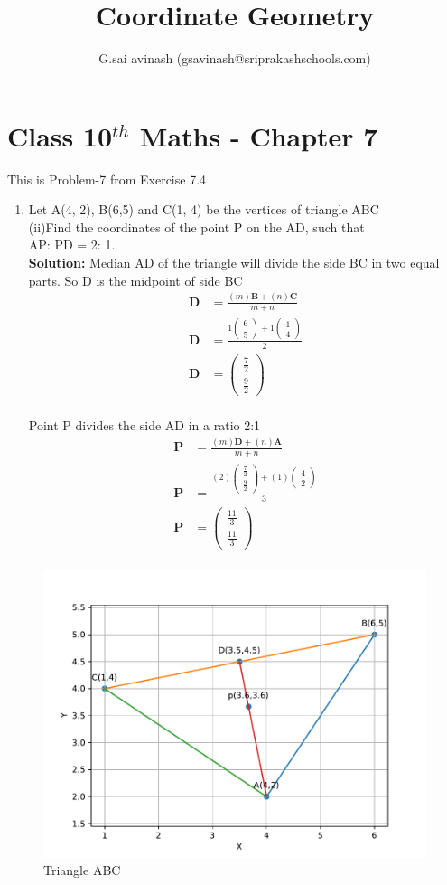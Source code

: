 \documentclass[10pt]{article}
\title{Coordinate Geometry}
\author{G.sai avinash (gsavinash@sriprakashschools.com)}
\newcommand{\myvec}[1]{\ensuremath{\begin{pmatrix}#1\end{pmatrix}}}
\newcommand{\solution}{\noindent \textbf{Solution: }}
\let\vec\mathbf
\begin{document}
\maketitle
\section*{Class 10$^{th}$ Maths - Chapter 7}
This is Problem-7 from Exercise 7.4
\begin{enumerate}
\item   Let A(4, 2), B(6,5) and C(1, 4) be the vertices of triangle ABC\\
(ii)Find the coordinates of the point P on the AD, such that \\
AP: PD = 2: 1.\\
\solution Median AD of the triangle will divide the side BC in two equal parts. So D is the midpoint of side BC\\ 
\begin{align}
\vec{D} &= \frac{(m)\vec{B} + (n)\vec{C}}{m+n}\\
\vec{D} &= \frac{1\myvec{6\\5} + 1\myvec{1\\4}}{2}\\
\vec{D} &= \myvec{\frac{7}{2}\\\frac{9}{2}}\\
\end{align}

Point P divides the side AD in a ratio 2:1\\
\begin{align}
\vec{P} &=\frac{(m)\vec{D}+(n)\vec{A}}{m+n}\\
\vec{P} &=\frac{(2)\myvec{\frac{7}{2}\\\frac{9}{2}}+(1)\myvec{4\\2}}{3}\\
\vec{P} &=\myvec{\frac{11}{3}\\\frac{11}{3}}\\
\end{align}
\end{enumerate}
\begin{figure}[H]
			\centering
			\includegraphics[width=\columnwidth]{figs/fig.pdf}
			\caption{Triangle ABC}
			\label{fig:9}
		\end{figure}
\end{document}
